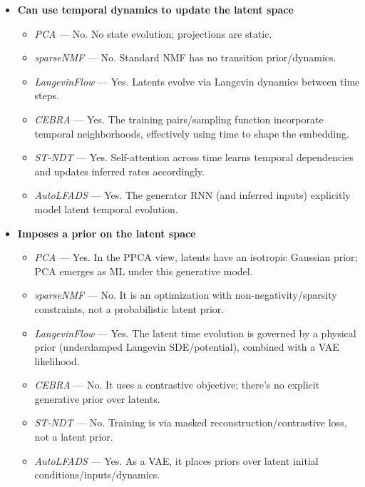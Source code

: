 \begin{itemize}
\item \textbf{Can use temporal dynamics to update the latent space}
    \begin{itemize}
    \item \textit{PCA} — No. No state evolution; projections are static.
    \item \textit{sparseNMF} — No. Standard NMF has no transition prior/dynamics.
    \item \textit{LangevinFlow} — Yes. Latents evolve via Langevin dynamics between time steps.
    \item \textit{CEBRA} — Yes. The training pairs/sampling function incorporate temporal neighborhoods, effectively using time to shape the embedding.
    \item \textit{ST-NDT} — Yes. Self-attention across time learns temporal dependencies and updates inferred rates accordingly.
    \item \textit{AutoLFADS} — Yes. The generator RNN (and inferred inputs) explicitly model latent temporal evolution.
    \end{itemize}

\item \textbf{Imposes a prior on the latent space}
    \begin{itemize}
    \item \textit{PCA} — Yes. In the PPCA view, latents have an isotropic Gaussian prior; PCA emerges as ML under this generative model.
    \item \textit{sparseNMF} — No. It is an optimization with non-negativity/sparsity constraints, not a probabilistic latent prior.
    \item \textit{LangevinFlow} — Yes. The latent time evolution is governed by a physical prior (underdamped Langevin SDE/potential), combined with a VAE likelihood.
    \item \textit{CEBRA} — No. It uses a contrastive objective; there's no explicit generative prior over latents.
    \item \textit{ST-NDT} — No. Training is via masked reconstruction/contrastive loss, not a latent prior.
    \item \textit{AutoLFADS} — Yes. As a VAE, it places priors over latent initial conditions/inputs/dynamics.
    \end{itemize}


\end{itemize}

